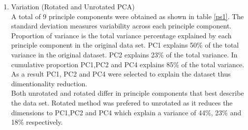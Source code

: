 \documentclass[12pt,a4paper]{article}
\begin{document}
\begin{enumerate}[label=\roman*)]
	\item Variation (Rotated and Unrotated PCA)\\
	 A total of 9 principle components were obtained as shown in table \ref{ps1}. The standard deviation measures variability across each principle component. Proportion of variance is the total variance percentage explained by each principle component in the original data set. PC1 explains 50\% of the total variance in the original dataset. PC2 explains 23\% of the total variance. In cumulative proportion PC1,PC2 and PC4 explains 85\% of the total variance. As a result PC1, PC2 and PC4 were selected to explain the dataset thus dimentionality reduction.\\
Both unrotated and rotated differ in principle components that best describe the data set. Rotated method was prefered to unrotated as it reduces the dimensions to PC1,PC2 and PC4 which explain a variance of 44\%, 23\% and 18\% respectively.


\end{enumerate}
\end{document}
